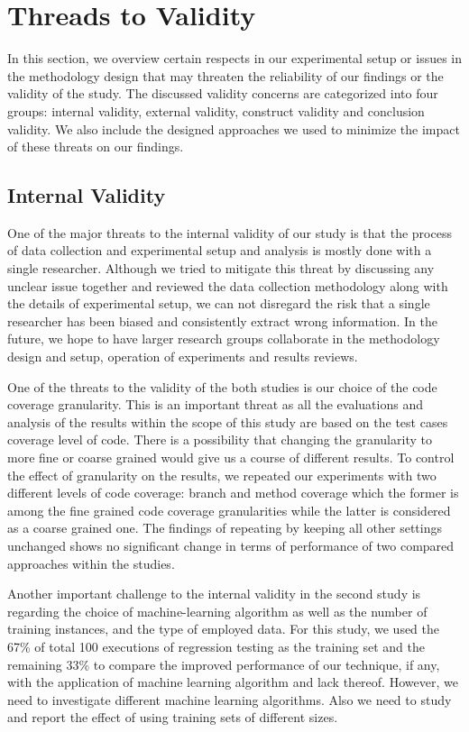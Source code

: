 \documentclass{sig-alternate}
\begin{document}
\section{Threads to Validity}
In this section, we overview certain respects in our experimental setup or issues in the methodology design that may threaten the reliability of our findings or the validity of the study. The discussed validity concerns are categorized into four groups: internal validity, external validity, construct validity and conclusion validity. We also include the designed approaches we used to minimize the impact of these threats on our findings.

\subsection{Internal Validity}
One of the major threats to the internal validity of our study is that the process of data collection and experimental setup and analysis is mostly done with a single researcher. Although we tried to mitigate this threat by discussing any unclear issue together and reviewed the data collection methodology along with the details of experimental setup, we can not disregard the risk that a single researcher has been biased and consistently extract wrong information. In the future, we hope to have larger research groups collaborate in the methodology design and setup, operation of experiments and results reviews.

One of the threats to the validity of the both studies is our choice of the code coverage granularity. This is an important threat as all the evaluations and analysis of the results within the scope of this study are based on the test cases coverage level of code. There is a possibility that changing the granularity to more fine or coarse grained would give us a course of different results. To control the effect of granularity on the results, we repeated our experiments with two different levels of code coverage: branch and method coverage which the former is among the fine grained code coverage granularities while the latter is considered as a coarse grained one. The findings of repeating by keeping all other settings unchanged shows no significant change in terms of performance of two compared approaches within the studies.

Another important challenge to the internal validity in the second study is regarding the choice of machine-learning algorithm as well as the number of training instances, and the type of employed data. For this study, we used the 67\% of total 100 executions of regression testing as the training set and the remaining 33\% to compare the improved performance of our technique, if any, with the application of machine learning algorithm and lack thereof. However, we need to investigate different machine learning algorithms. Also we need to study and report the effect of using training sets of different sizes.
\end{document}
